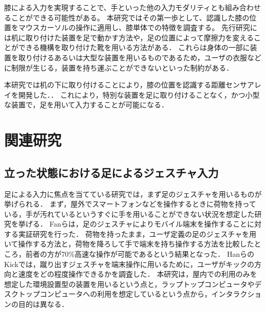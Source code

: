 \documentclass[submit, techrep]{ipsj}
\begin{document}
膝による入力を実現することで、手といった他の入力モダリティとも組み合わせることができる可能性がある。
本研究ではその第一歩として、認識した膝の位置をマウスカーソルの操作に適用し、膝単体での特徴を調査する。
先行研究には机に取り付けた装置を足で動かす方法\cite{Pearson:1986:MMD:22627.22392, Pearson:1988:EEP:57167.57169}や，足の位置によって摩擦力を変えることができる機構を取り付けた靴\cite{Horodniczy:2017:FHE:3025453.3025625}を用いる方法がある．
これらは身体の一部に装置を取り付けるあるいは大型な装置を用いるものであるため，ユーザの衣服などに制限が生じる，装置を持ち運ぶことができないといった制約がある．\par
本研究では机の下に取り付けることにより，膝の位置を認識する距離センサアレイを開発した．．
これにより，特別な装置を足に取り付けることなく，かつ小型な装置で，足を用いて入力することが可能になる．


\section{関連研究}
\subsection{立った状態における足によるジェスチャ入力}
足による入力に焦点を当てている研究では，まず足のジェスチャを用いるものが挙げられる．
まず，屋外でスマートフォンなどを操作するときに荷物を持っている，手が汚れているというすぐに手を用いることができない状況を想定した研究を挙げる．
Fanら\cite{Fan:2017:ESF:3123021.3123043}は，足のジェスチャによりモバイル端末を操作することに対する実証研究を行った．
荷物を持ったまま，ユーザ定義の足のジェスチャを用いて操作する方法と，荷物を降ろして手で端末を持ち操作する方法を比較したところ，前者の方が70\%高速な操作が可能であるという結果となった．
HanらのKick\cite{Han:2011:KIU:2037373.2037379}では，蹴り出すジェスチャを端末操作に用いるために，ユーザがキックの方向と速度をどの程度操作できるかを調査した．
本研究は，屋内での利用のみを想定した環境設置型の装置を用いるという点と，ラップトップコンピュータやデスクトップコンピュータへの利用を想定しているという点から，インタラクションの目的は異なる．\par
\end{document}

